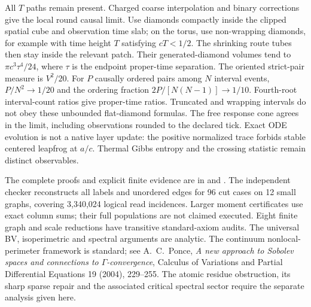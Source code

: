 All $T$ paths remain present. Charged coarse interpolation and binary
corrections give the local round causal limit. Use diamonds compactly
inside the clipped spatial cube and observation time slab; on the torus,
use non-wrapping diamonds, for example with time height $T$ satisfying
$cT<1/2$. The shrinking route tubes then stay inside the relevant patch.
Their generated-diamond volumes tend to $\pi c^3\tau^4/24$, where $\tau$
is the endpoint proper-time separation. The oriented strict-pair measure
is $V^2/20$. For $P$ causally ordered pairs among $N$ interval events,
$P/N^2\to1/20$ and the ordering fraction $2P/[N(N-1)]\to1/10$.
Fourth-root interval-count ratios give proper-time ratios.
Truncated and wrapping intervals do not obey these
unbounded flat-diamond formulas. The free
response cone agrees in the limit, including observations rounded to the
declared tick. Exact ODE evolution is not a native layer update: the
positive normalized trace forbids stable centered leapfrog at $a/c$.
Thermal Gibbs entropy and the crossing statistic remain distinct observables.

The complete proofs and explicit finite evidence are in
 and
. The independent checker reconstructs
all labels and unordered edges for 96 cut cases on 12 small graphs, covering
3,340,024 logical read incidences. Larger moment certificates use exact
column sums; their full populations are not claimed executed. Eight finite
graph and scale reductions have transitive standard-axiom audits. The
universal BV, isoperimetric and spectral arguments are analytic. The
continuum nonlocal-perimeter framework is standard; see A.~C.~Ponce,
\emph{A new approach to Sobolev spaces and connections to $\Gamma$-convergence},
Calculus of Variations and Partial Differential Equations 19 (2004), 229--255.
The atomic residue obstruction, its sharp sparse repair and the associated
critical spectral sector require the separate analysis given here.

